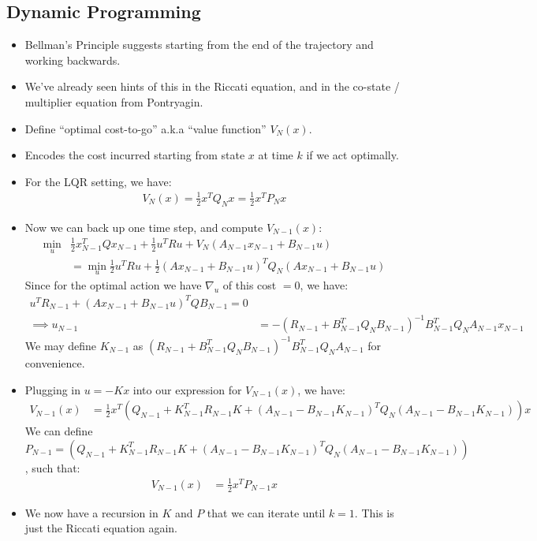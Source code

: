 \subsection{Dynamic Programming}
\begin{itemize}
    \item Bellman's Principle suggests starting from the end of the trajectory and working backwards.
    \item We've already seen hints of this in the Riccati equation, and in the co-state / multiplier equation from Pontryagin.
    \item Define ``optimal cost-to-go'' a.k.a ``value function'' $V_N(x)$.
    \item Encodes the cost incurred starting from state $x$ at time $k$ if we act optimally.
    \item For the LQR setting, we have:
    \begin{align}
        V_N(x) = \frac{1}{2} x^T Q_N x = \frac{1}{2} x^T P_N x
    \end{align}
    \item Now we can back up one time step, and compute $V_{N-1}(x)$:
    \begin{align}
        \min_u & \frac{1}{2} x_{N-1}^T Q x_{N-1} + \frac{1}{2} u^T R u + V_N (A_{N-1} x_{N-1} + B_{N-1} u) \\
        &= \min_u \frac{1}{2} u^T R u + \frac{1}{2} (A x_{N-1} + B_{N-1} u)^T Q_N  (A x_{N-1} + B_{N-1} u)
    \end{align}
    Since for the optimal action we have $\nabla_u $ of this cost $=0$, we have:
\begin{align}
    u^T R_{N-1} + (A x_{N-1} + B_{N-1} u)^T Q B_{N-1} = 0 \\
    \implies u_{N-1} &= -(R_{N-1} + B_{N-1}^T Q_N B_{N-1})^{-1} B_{N-1}^T Q_N A_{N-1} x_{N-1}
\end{align}
    We may define $K_{N-1}$ as $(R_{N-1} + B_{N-1}^T Q_N B_{N-1})^{-1} B_{N-1}^T Q_N A_{N-1}$ for convenience.
    \item Plugging in $u=-Kx$ into our expression for $V_{N-1}(x)$, we have:
    \begin{align}
        V_{N-1}(x) &= \frac{1}{2} x^T (Q_{N-1} + K_{N-1}^T R_{N-1} K + (A_{N-1} - B_{N-1} K_{N-1})^T Q_N (A_{N-1} - B_{N-1} K_{N-1}) ) x
    \end{align}
    We can define $P_{N-1} = (Q_{N-1} + K_{N-1}^T R_{N-1} K + (A_{N-1} - B_{N-1} K_{N-1})^T Q_N (A_{N-1} - B_{N-1} K_{N-1}) )$, such that:
    \begin{align}
        V_{N-1}(x) &= \frac{1}{2} x^T P_{N-1} x
    \end{align}

    \item We now have a recursion in $K$ and $P$ that we can iterate until $k=1$. This is just the Riccati equation again.
\end{itemize}

